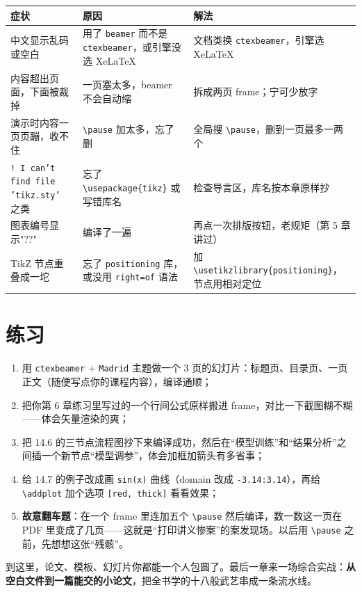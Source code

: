 
\begin{table}[htbp]
\centering
\small
\begin{tabularx}{\linewidth}{@{}*{3}{>{\raggedright\arraybackslash}X}@{}}
\toprule
\textbf{症状} & \textbf{原因} & \textbf{解法} \\
\midrule
中文显示乱码或空白 & 用了 \texttt{beamer} 而不是 \texttt{ctexbeamer}，或引擎没选 XeLaTeX & 文档类换 \texttt{ctexbeamer}，引擎选 XeLaTeX \\
内容超出页面，下面被裁掉 & 一页塞太多，beamer 不会自动缩 & 拆成两页 frame；宁可少放字 \\
演示时内容一页页蹦，收不住 & \texttt{\textbackslash{}pause} 加太多，忘了删 & 全局搜 \texttt{\textbackslash{}pause}，删到一页最多一两个 \\
\texttt{! I can't find file 'tikz.sty'} 之类 & 忘了 \texttt{\textbackslash{}usepackage\{tikz\}} 或写错库名 & 检查导言区，库名按本章原样抄 \\
图表编号显示"??" & 编译了一遍 & 再点一次排版按钮，老规矩（第 5 章讲过） \\
TikZ 节点重叠成一坨 & 忘了 \texttt{positioning} 库，或没用 \texttt{right=of} 语法 & 加 \texttt{\textbackslash{}usetikzlibrary\{positioning\}}，节点用相对定位 \\
\bottomrule
\end{tabularx}
\end{table}

\section*{练习}

\begin{enumerate}
\setlength{\itemsep}{2pt}
\item 用 \texttt{ctexbeamer} + \texttt{Madrid} 主题做一个 3 页的幻灯片：标题页、目录页、一页正文（随便写点你的课程内容），编译通顺；
\item 把你第 6 章练习里写过的一个行间公式原样搬进 frame，对比一下截图糊不糊——体会矢量渲染的爽；
\item 把 14.6 的三节点流程图抄下来编译成功，然后在“模型训练”和“结果分析”之间插一个新节点“模型调参”，体会加框加箭头有多省事；
\item 给 14.7 的例子改成画 \texttt{sin(x)} 曲线（domain 改成 \texttt{-3.14:3.14}），再给 \texttt{\textbackslash{}addplot} 加个选项 \texttt{[red, thick]} 看看效果；
\item \textbf{故意翻车题}：在一个 frame 里连加五个 \texttt{\textbackslash{}pause} 然后编译，数一数这一页在 PDF 里变成了几页——这就是“打印讲义惨案”的案发现场。以后用 \texttt{\textbackslash{}pause} 之前，先想想这张“残骸”。
\end{enumerate}

到这里，论文、模板、幻灯片你都能一个人包圆了。最后一章来一场综合实战：\textbf{从空白文件到一篇能交的小论文}，把全书学的十八般武艺串成一条流水线。
